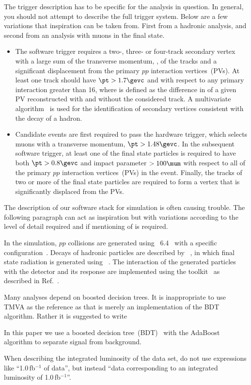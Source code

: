 The trigger description has to be specific for the analysis in
question. In general, you should not attempt to describe the full
trigger system. Below are a few variations that inspiration can be
taken from. First from a hadronic analysis, and second from an
analysis with muons in the final state.
\begin{itemize}
\item The software trigger requires a two-, three- or four-track
  secondary vertex with a large sum of the transverse momentum, \pt, of
  the tracks and a significant displacement from the primary $pp$
  interaction vertices~(PVs). At least one track should have $\pt >
  1.7\gevc$ and \chisqip with respect to any
  primary interaction greater than 16, where \chisqip is defined as the
  difference in \chisq of a given PV reconstructed with and
  without the considered track. A multivariate algorithm~\cite{BBDT} is used for
  the identification of secondary vertices consistent with the decay
  of a \bquark hadron.
\item Candidate events are first required to pass the hardware trigger,
  which selects muons with a transverse momentum, $\pt>1.48\gevc$. In
  the subsequent software trigger, at least
  one of the final state particles is required to have both
  $\pt>0.8\gevc$ and impact parameter $>100\mum$ with respect to all
  of the primary $pp$ interaction vertices~(PVs) in the
  event. Finally, the tracks of two or more of the final state
  particles are required to form a vertex that is significantly
  displaced from the PVs.
\end{itemize}

The description of our software stack for simulation is often
causing trouble. The following paragraph can act as inspiration but
with variations according to the level of detail required and if
mentioning of \eg \photos is required.

In the simulation, $pp$ collisions are generated using
\pythia~6.4~\cite{Sjostrand:2006za} with a specific \lhcb
configuration~\cite{LHCb-PROC-2010-056}.  Decays of hadronic particles
are described by \evtgen~\cite{Lange:2001uf}, in which final state
radiation is generated using \photos~\cite{Golonka:2005pn}. The
interaction of the generated particles with the detector and its
response are implemented using the \geant
toolkit~\cite{Allison:2006ve, *Agostinelli:2002hh} as described in
Ref.~\cite{LHCb-PROC-2011-006}.

Many analyses depend on boosted decision trees. It is inappropriate to
use TMVA as the reference as that is merely an implementation of the
BDT algorithm. Rather it is suggested to write

In this paper we use a boosted decision tree~(BDT)~\cite{Breiman} with
the AdaBoost algorithm\cite{AdaBoost} to separate signal from
background.

When describing the integrated luminosity of the data set, do not use
expressions like ``1.0\,fb$^{-1}$ of data'', but instead 
``data corresponding to an integrated luminosity of 1.0\,fb$^{-1}$''.

